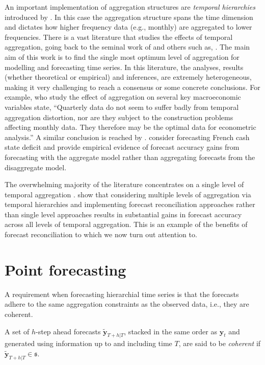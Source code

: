 \documentclass[graybox]{svmult}
\begin{document}
An important implementation of aggregation structures are \textit{temporal hierarchies} introduced by \cite{AthEtAl2017}. In this case the aggregation structure spans the time dimension and dictates how higher frequency data (e.g., monthly) are aggregated to lower frequencies. There is a vast literature that studies the effects of temporal aggregation, going back to the seminal work of \cite{ZelMon1971, AmeWu1972, Tia1972, Bre1973} and others such as, \cite{Hot1993, HotCar1993, Mar1999, SilEtAl2008}. The main aim of this work is to find the single most optimum level of aggregation for modelling and forecasting time series. In this literature, the analyses, results (whether theoretical or empirical) and inferences, are extremely heterogeneous, making it very challenging to reach a consensus or some concrete conclusions. For example, \cite{RosSea1995} who study the effect of aggregation on several key macroeconomic variables state, ``Quarterly data do not seem to suffer badly from temporal aggregation distortion, nor are they subject to the construction problems affecting monthly data. They therefore may be the optimal data for econometric analysis.'' A similar conclusion is reached by \cite{NijPal1990}. \cite{SilEtAl2008} consider forecasting French cash state deficit and provide empirical evidence of forecast accuracy gains from forecasting with the aggregate model rather than aggregating forecasts from the disaggregate model.

The overwhelming majority of the literature concentrates on a single level of temporal aggregation \citep[there are some notable exceptions such as,][]{AndEtAl2011,KouEtAl2014}. \cite{AthEtAl2017} show that considering multiple levels of aggregation via temporal hierarchies and implementing forecast reconciliation approaches rather than single level approaches results in substantial gains in forecast accuracy across all levels of temporal aggregation. This is an example of the benefits of forecast reconciliation to which we now turn out attention to.

\section{Point forecasting}\label{sec:point forecasting}

A requirement when forecasting hierarchial time series is that the forecasts adhere to the same aggregation constraints as the observed data, i.e., they are coherent.

\begin{definition}
A set of $h$-step ahead forecasts $\tilde{\bm{y}}_{T+h|T}$, stacked in the same order as $\bm{y}_{t}$ and generated using information up to and including time $T$,
are said to be \textit{coherent} if $\tilde{\bm{y}}_{T+h|T} \in \mathfrak{s}$.
  \label{def:coherence}
\end{definition}
\end{document}
